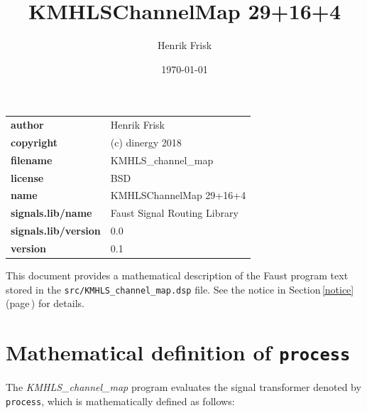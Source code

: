 \documentclass{article}
\newcommand{\faustfilename}{src/KMHLS\_channel\_map.dsp}
\newcommand{\faustprogname}{KMHLS\_channel\_map}
\begin{document}
\title{KMHLSChannelMap 29+16+4} \author{ Henrik Frisk } \date{\today} \maketitle \begin{tabular}{ll}  \hline  \textbf{author} &  Henrik Frisk  \\  \textbf{copyright} & (c) dinergy 2018  \\  \textbf{filename} & KMHLS\_channel\_map \\  \textbf{license} &  BSD  \\  \textbf{name} & KMHLSChannelMap 29+16+4 \\  \textbf{signals.lib/name} & Faust Signal Routing Library \\  \textbf{signals.lib/version} & 0.0 \\  \textbf{version} &  0.1  \\  \hline \end{tabular} \bigskip  \bigskip This document provides a mathematical description of the Faust program text stored in the \texttt{\faustfilename} file. See the notice in Section\,\ref{notice} (page\,\pageref{notice}) for details.   \section{Mathematical definition of \texttt{process}} \label{equation}  The \emph{\faustprogname} program evaluates the signal transformer denoted by \texttt{process}, which is mathematically defined as follows: 
\end{document}
